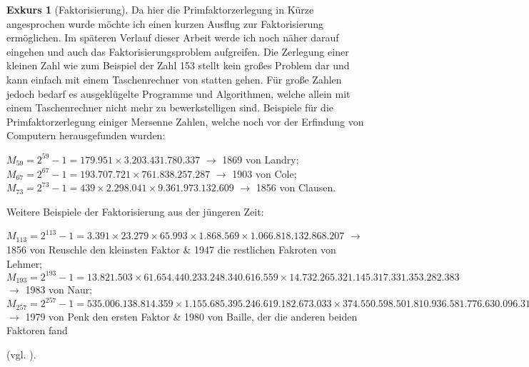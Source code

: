 \documentclass[12pt,a4paper]{article}
\theoremstyle{definition}
\newtheorem{exkurs}{Exkurs}
\begin{document}
\newpage
\begin{exkurs}[Faktorisierung]Da hier die Primfaktorzerlegung in Kürze angesprochen wurde möchte ich einen kurzen Ausflug zur Faktorisierung ermöglichen.
Im späteren Verlauf dieser Arbeit werde ich noch näher darauf eingehen und auch das Faktorisierungsproblem aufgreifen.\newline
Die Zerlegung einer kleinen Zahl wie zum Beispiel der Zahl 153 stellt kein großes Problem dar und kann einfach mit einem Taschenrechner von statten gehen.
Für große Zahlen jedoch bedarf es ausgeklügelte Programme und Algorithmen, welche allein mit einem Taschenrechner nicht mehr zu bewerkstelligen sind.\newline
Beispiele für die Primfaktorzerlegung einiger Mersenne Zahlen, welche noch vor der Erfindung von Computern herausgefunden wurden:
\begin{center}
$M_{59} = 2^{59}-1 = 179.951\times3.203.431.780.337$ $\rightarrow$ 1869 von Landry;\\
$M_{67} = 2^{67}-1 = 193.707.721\times761.838.257.287$ $\rightarrow$ 1903 von Cole;\\
$M_{73} = 2^{73}-1 = 439\times2.298.041\times9.361.973.132.609$ $\rightarrow$ 1856 von Clausen.\\
\end{center}
Weitere Beispiele der Faktorisierung aus der jüngeren Zeit:
\begin{center}
$M_{113} = 2^{113}-1 = 3.391\times23.279\times65.993\times1.868.569\times1.066.818.132.868.207$ $\rightarrow$ 1856 von Reuschle den kleinsten Faktor \& 1947 die restlichen Fakroten von Lehmer;\\
$M_{193} = 2^{193}-1 = 13.821.503\times61.654.440.233.248.340.616.559\times14.732.265.321.145.317.331.353.282.383$ $\rightarrow$ 1983 von Naur;\\
$M_{257} = 2^{257}-1 = 535.006.138.814.359\times1.155.685.395.246.619.182.673.033\times374.550.598.501.810.936.581.776.630.096.313.181.393$ $\rightarrow$ 1979 von Penk den ersten Faktor \& 1980 von Baille, der die anderen beiden Faktoren fand\end{center} (vgl. \cite[125--128]{Ribenboim2006}).\end{exkurs}
\end{document}
